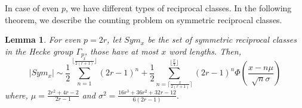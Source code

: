 \documentclass[11pt]{amsart}
\numberwithin{equation}{section}
\newtheorem{lemma}[theorem]{Lemma}
\numberwithin{equation}{section}
\begin{document}
    \medskip
		In case of even $p$, we have different types of reciprocal classes. In the following theorem, we describe the counting problem on symmetric reciprocal classes.
	
	\begin{lemma}\label{4.6}
	For even $p=2r $, let $Sym_{x}$ be the set of symmetric reciprocal classes in the Hecke group $\Gamma_{p}$, those have at most $x$ word lengths. Then,
	\[\left|Sym_{x}\right|\sim 	\frac{1}{2}\sum_{n=1}^{\lfloor \frac{x}{2(r+1)}\rfloor}(2r-1)^{n}+\frac{1}{2}{\sum_{n=\lceil \frac{x}{2(r+1)}\rceil}^{\lfloor\frac{x}{4}\rfloor}(2r-1)^{n}\Phi\left(\frac{x-n\mu}{\sqrt{n}\sigma}\right)} \] where, $\mu=\frac{2r^2 + 4r - 2}{2r - 1}$ and $\sigma^{2}=\frac{16r^3 + 36r^2 + 32r - 12}{6(2r - 1)}.$
\end{lemma}			
		
\end{document}
